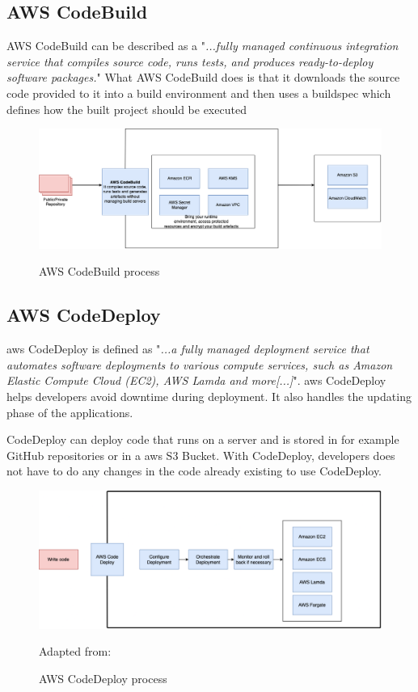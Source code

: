 \subsection{AWS CodeBuild }
AWS CodeBuild can be described as a "\textit{...fully managed continuous integration service that compiles source code, runs tests, and produces ready-to-deploy software packages.}"
\cite{AWSCodeBuild}
What AWS CodeBuild does is that it downloads the source code provided to it into a build environment and then uses a \Gls{buildspec} which defines how the built project should be executed\cite{AWSCodeBuild1}
\begin{figure}[H]
    \centering
    \includegraphics[scale=0.4]{Images/CodeBuild.png}
    \caption{AWS CodeBuild process}\cite{AWSCodeBuild}
    \label{fig:AWS CodeBuild Process}
\end{figure}

\subsection{AWS CodeDeploy}
\acrshort{aws} CodeDeploy is defined as "\textit{...a fully managed deployment service that automates software deployments to various compute services, such as Amazon Elastic Compute Cloud (EC2), AWS Lamda and more[...]}"\cite{AWSCodeDeploy}.
\acrshort{aws} CodeDeploy helps developers avoid downtime during deployment. It also handles the updating phase of the applications. 

CodeDeploy can deploy code that runs on a server and is stored in for example GitHub repositories or in a \acrshort{aws} S3 Bucket. With CodeDeploy, developers does not have to do any changes in the code already existing to use CodeDeploy. \cite{CodeDeploy1}

\begin{figure}[H]
    \centering
    \includegraphics[scale=0.4]{Images/AWSCodeDeploy.png}
    \caption{AWS CodeDeploy process} Adapted from: \cite{CodeDeploy1}
    \label{fig:AWS CodeDeploy Process}
\end{figure}


